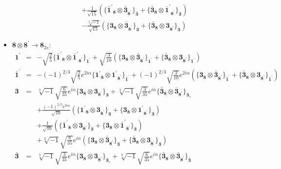 \documentclass[english]{article}
\newcommand{\subcg}[3]{\big\{ {#1}\otimes{#2}\big\}^{}_{#3}}
\newcommand{\rep}[1]{\mathbf{#1}}
\begin{document}
\begin{itemize}
\begin{eqnarray*}
 & & +\frac{1}{\sqrt{15}}\left(\subcg{\rep{\bar{1}^{\prime}}_{\rep{8}}}{\rep{\bar{3}}_{\rep{8^{\prime}}}}{\rep{\bar{3}}}+\subcg{\rep{\bar{3}}_{\rep{8}}}{\rep{\bar{1}^{\prime}}_{\rep{8^{\prime}}}}{\rep{\bar{3}}}\right) \\ 
 & & -\frac{\sqrt[6]{-1}}{\sqrt{15}}\left(\subcg{\rep{3}_{\rep{8}}}{\rep{\bar{3}}_{\rep{8^{\prime}}}}{\rep{\bar{3}}}+\subcg{\rep{\bar{3}}_{\rep{8}}}{\rep{3}_{\rep{8^{\prime}}}}{\rep{\bar{3}}}\right)
\end{eqnarray*}
\item $\rep{8}\otimes\rep{8^{\prime}}\to\rep{8}_{2s}$:
\begin{eqnarray*}
\rep{1^{\prime}} &=& -\sqrt{\frac{2}{5}}\subcg{\rep{\bar{1}^{\prime}}_{\rep{8}}}{\rep{\bar{1}^{\prime}}_{\rep{8^{\prime}}}}{\rep{1^{\prime}}}+\sqrt{\frac{3}{10}}\left(\subcg{\rep{3}_{\rep{8}}}{\rep{\bar{3}}_{\rep{8^{\prime}}}}{\rep{1^{\prime}}}+\subcg{\rep{\bar{3}}_{\rep{8}}}{\rep{3}_{\rep{8^{\prime}}}}{\rep{1^{\prime}}}\right)
\\
\rep{\bar{1}^{\prime}} &=& -(-1)^{2/3} \sqrt{\frac{2}{5}} e^{2 i \alpha }\subcg{\rep{1^{\prime}}_{\rep{8}}}{\rep{1^{\prime}}_{\rep{8^{\prime}}}}{\rep{\bar{1}^{\prime}}}+(-1)^{2/3} \sqrt{\frac{3}{10}} e^{2 i \alpha }\left(\subcg{\rep{3}_{\rep{8}}}{\rep{\bar{3}}_{\rep{8^{\prime}}}}{\rep{\bar{1}^{\prime}}}+\subcg{\rep{\bar{3}}_{\rep{8}}}{\rep{3}_{\rep{8^{\prime}}}}{\rep{\bar{1}^{\prime}}}\right)
\\
\rep{3} &=& \sqrt[3]{-1} \sqrt{\frac{6}{35}} e^{i \alpha }\subcg{\rep{3}_{\rep{8}}}{\rep{3}_{\rep{8^{\prime}}}}{\rep{3}}+\sqrt[3]{-1} \sqrt{\frac{3}{35}} e^{i \alpha }\subcg{\rep{\bar{3}}_{\rep{8}}}{\rep{\bar{3}}_{\rep{8^{\prime}}}}{\rep{3}_{s}} \\ 
 & & +\frac{(-1)^{2/3} e^{2 i \alpha }}{\sqrt{10}}\left(\subcg{\rep{1^{\prime}}_{\rep{8}}}{\rep{3}_{\rep{8^{\prime}}}}{\rep{3}}+\subcg{\rep{3}_{\rep{8}}}{\rep{1^{\prime}}_{\rep{8^{\prime}}}}{\rep{3}}\right) \\ 
 & & +\frac{1}{\sqrt{10}}\left(\subcg{\rep{\bar{1}^{\prime}}_{\rep{8}}}{\rep{3}_{\rep{8^{\prime}}}}{\rep{3}}+\subcg{\rep{3}_{\rep{8}}}{\rep{\bar{1}^{\prime}}_{\rep{8^{\prime}}}}{\rep{3}}\right) \\ 
 & & +\sqrt[3]{-1} \sqrt{\frac{6}{35}} e^{i \alpha }\left(\subcg{\rep{3}_{\rep{8}}}{\rep{\bar{3}}_{\rep{8^{\prime}}}}{\rep{3}}+\subcg{\rep{\bar{3}}_{\rep{8}}}{\rep{3}_{\rep{8^{\prime}}}}{\rep{3}}\right)
\\
\rep{\bar{3}} &=& \sqrt[3]{-1} \sqrt{\frac{3}{35}} e^{i \alpha }\subcg{\rep{3}_{\rep{8}}}{\rep{3}_{\rep{8^{\prime}}}}{\rep{\bar{3}}_{s}}+\sqrt[3]{-1} \sqrt{\frac{6}{35}} e^{i \alpha }\subcg{\rep{\bar{3}}_{\rep{8}}}{\rep{\bar{3}}_{\rep{8^{\prime}}}}{\rep{\bar{3}}} \\ 

\end{eqnarray*}
\end{itemize}
\end{document}
